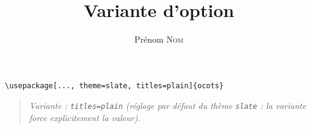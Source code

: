 \documentclass[11pt]{ocots-book}
\title{Variante d'option}
\author{Prénom \textsc{Nom}}
\newcommand{\ocotsvariantnote}[1]{\begin{quote}\itshape Variante : #1\end{quote}}
\begin{document}
\maketitle

\begin{lstlisting}
\usepackage[..., theme=slate, titles=plain]{ocots}
\end{lstlisting}
\ocotsvariantnote{\texttt{titles=plain} (r\'eglage par d\'efaut du th\`eme \texttt{slate} : la variante force explicitement la valeur).}

\end{document}
